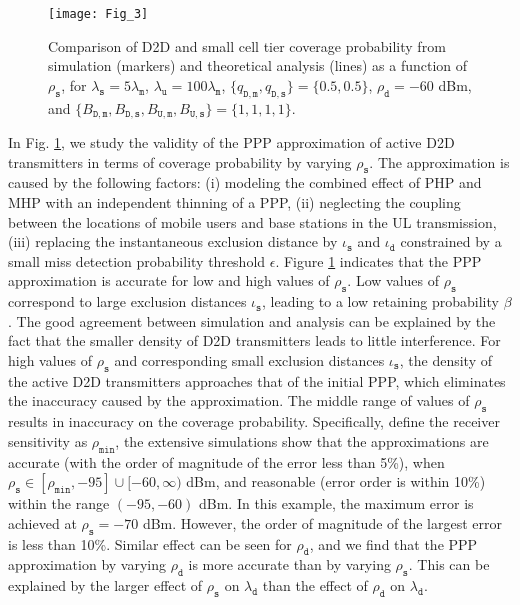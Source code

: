 \documentclass[twocolumn,english]{IEEEtran}
\theoremstyle{plain}
\theoremstyle{definition}
\begin{document}
\begin{figure}[t]
\centering\texttt{[image: Fig\_3]}

\protect\caption{\label{fig:D2D_Small_cove_rho_s_d}Comparison of D2D and small cell
tier coverage probability from simulation (markers) and theoretical
analysis (lines) as a function of $\rho_{\mathtt{s}}$, for $\lambda_{\mathtt{s}}=5\lambda_{\mathtt{m}}$,
$\lambda_{\mathtt{u}}=100\lambda_{\mathtt{m}}$, $\{q_{\mathtt{D,m}},q_{\mathtt{D,s}}\}=\{0.5,0.5\}$,
$\rho_{\mathtt{d}}=-60$ dBm, and $\{B_{\mathtt{D,m}},B_{\mathtt{D,s}},B_{\mathtt{U,m}},B_{\mathtt{U,s}}\}=\{1,1,1,1\}$.}
\end{figure}


In Fig. \ref{fig:D2D_Small_cove_rho_s_d}, we study the validity of
the PPP approximation of active D2D transmitters in terms of coverage
probability by varying $\rho_{\mathtt{s}}$. The approximation is
caused by the following factors: (i) modeling the combined effect
of PHP and MHP with an independent thinning of a PPP, (ii) neglecting
the coupling between the locations of mobile users and base stations
in the UL transmission, (iii) replacing the instantaneous exclusion
distance by $\iota_{\mathtt{s}}$ and $\iota_{\mathtt{d}}$ constrained
by a small miss detection probability threshold $\epsilon$. Figure
\ref{fig:D2D_Small_cove_rho_s_d} indicates that the PPP approximation
is accurate for low and high values of $\rho_{\mathtt{s}}$. Low values
of $\rho_{\mathtt{s}}$ correspond to large exclusion distances $\iota_{\mathtt{s}}$,
leading to a low retaining probability $\beta$. The good agreement
between simulation and analysis can be explained by the fact that
the smaller density of D2D transmitters leads to little interference.
For high values of $\rho_{\mathtt{s}}$ and corresponding small exclusion
distances $\iota_{\mathtt{s}}$, the density of the active D2D transmitters
approaches that of the initial PPP, which eliminates the inaccuracy
caused by the approximation. The middle range of values of $\rho_{\mathtt{s}}$
results in inaccuracy on the coverage probability. Specifically, define
the receiver sensitivity as $\rho_{\mathtt{min}}$, the extensive
simulations show that the approximations are accurate (with the order
of magnitude of the error less than 5\%), when $\rho_{\mathtt{s}}\in[\rho_{\mathtt{min}},-95]\cup[-60,\infty)$
dBm, and reasonable (error order is within 10\%) within the range
$(-95,-60)$ dBm. In this example, the maximum error is achieved at
$\rho_{\mathtt{s}}=-70$ dBm. However, the order of magnitude of the
largest error is less than 10\%. Similar effect can be seen for $\rho_{\mathtt{d}}$,
and we find that the PPP approximation by varying $\rho_{\mathtt{d}}$
is more accurate than by varying $\rho_{\mathtt{s}}$. This can be
explained by the larger effect of $\rho_{\mathtt{s}}$ on $\lambda_{\mathtt{d}}$
than the effect of $\rho_{\mathtt{d}}$ on $\lambda_{\mathtt{d}}$.
\end{document}

